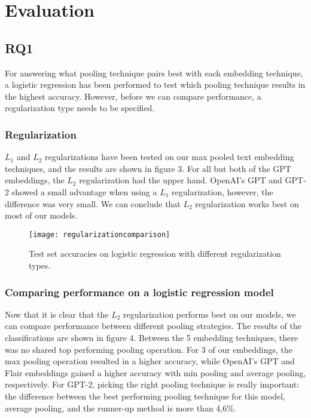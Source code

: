 \section{Evaluation}
\subsection{RQ1}
For answering what pooling technique pairs best with each embedding technique, a logistic regression has been performed to test which pooling technique results in the highest accuracy.
However, before we can compare performance, a regularization type needs to be specified. 

\subsubsection{Regularization}

$L_{1}$ and $L_{2}$ regularizations have been tested on our max pooled text embedding techniques, and the results are shown in figure 3.
For all but both of the GPT embeddings, the $L_{2}$ regularization had the upper hand.
OpenAI's GPT and GPT-2 showed a small advantage when using a $L_{1}$ regularization, however, the difference was very small.
We can conclude that $L_{2}$ regularization works best on most of our models.

\begin{figure}[t]
    \centering
    \texttt{[image: regularizationcomparison]}
    \caption{Test set accuracies on logistic regression with different regularization types.}
\end{figure}

\subsubsection{Comparing performance on a logistic regression model}
Now that it is clear that the $L_{2}$ regularization performs best on our models, we can compare performance between different pooling strategies.
The results of the classifications are shown in figure 4.
Between the 5 embedding techniques, there was no shared top performing pooling operation. 
For 3 of our embeddings, the max pooling operation resulted in a higher accuracy, while OpenAI's GPT and Flair embeddings gained a higher accuracy with min pooling and average pooling, respectively.
For GPT-2, picking the right pooling technique is really important: the difference between the best performing pooling technique for this model, average pooling, and the runner-up method is more than 4,6\%. 

